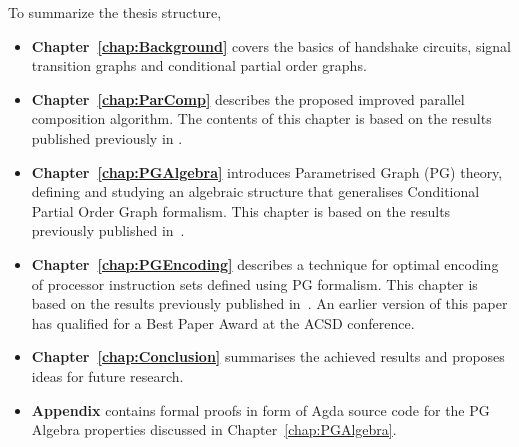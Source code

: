 To summarize the thesis structure,

\begin{itemize}
\item
\textbf{Chapter~\ref{chap:Background}} covers the basics of handshake circuits, signal transition graphs and conditional partial order graphs.

\item
\textbf{Chapter~\ref{chap:ParComp}} describes the proposed improved parallel composition algorithm. The contents of this chapter is based on the results published previously in \cite{improved_par_comp}.

\item
\textbf{Chapter~\ref{chap:PGAlgebra}} introduces Parametrised Graph (PG) theory, defining and studying an algebraic structure that generalises Conditional Partial Order Graph formalism. This chapter is based on the results previously published in~\cite{pg_algebra}.

\item
\textbf{Chapter~\ref{chap:PGEncoding}} describes a technique for optimal encoding of processor instruction sets defined using PG formalism. This chapter is based on the results previously published in~\cite{cpog_encoding}. An earlier version of this paper has qualified for a Best Paper Award at the ACSD conference.

\item
\textbf{Chapter~\ref{chap:Conclusion}} summarises the achieved results and proposes ideas for future research.

\item
\textbf{Appendix} contains formal proofs in form of Agda source code for the PG Algebra properties discussed in Chapter~\ref{chap:PGAlgebra}.

\end{itemize}
